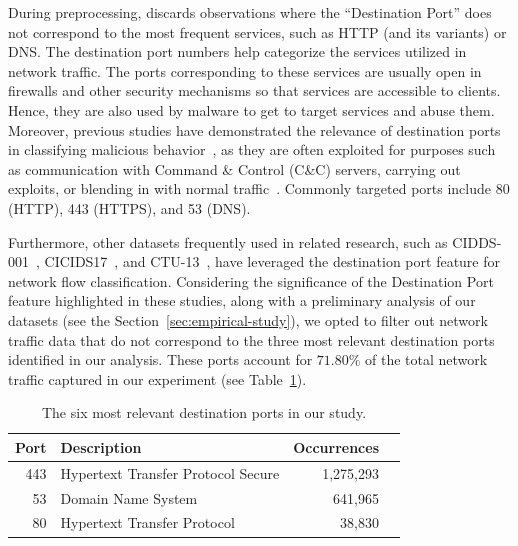 

During preprocessing, \droidxpflow discards observations where the ``Destination Port'' does not correspond to the most frequent services,
such as HTTP (and its variants) or DNS. The destination port numbers help categorize the services utilized in network traffic. The ports corresponding to these services are usually open in firewalls and other security mechanisms so that services are accessible to clients. Hence, they are also used by malware to get to target services and abuse them. Moreover, 
previous studies have demonstrated the relevance of destination ports in classifying malicious behavior~\cite{DBLP:journals/compsec/UmerSB17,DBLP:journals/comsur/SperottoSSMPS10},
as they are often exploited for purposes such as communication with Command \& Control (C\&C) servers, carrying out exploits,
or blending in with normal traffic~\cite{DBLP:journals/comsur/SperottoSSMPS10}. Commonly targeted ports include 80 (HTTP), 443 (HTTPS), and 53 (DNS).

Furthermore, other datasets frequently used in related research, such as CIDDS-001~\cite{Ring2017FlowbasedBD}, CICIDS17~\cite{DBLP:conf/icict/MahfouzVS19},
and CTU-13~\cite{DBLP:journals/compsec/GarciaGSZ14}, have leveraged the destination port feature for network flow classification.
Considering the significance of the Destination Port feature highlighted in these studies, along with a preliminary analysis of our datasets
(see the Section~\ref{sec:empirical-study}), we opted to filter out network traffic data that do not correspond to the three most
relevant destination ports identified in our analysis. These ports account for $71.80\%$ of the total network traffic captured in our experiment
(see Table~\ref{tab:port}).

\begin{table}[h]
\centering
\caption{The six most relevant destination ports in our study.}
\begin{small}
\begin{tabular}{rlrl} 
\hline
Port & Description & Occurrences \\ 
\hline
443 & Hypertext Transfer Protocol Secure & 1,275,293 \\ 
53 & Domain Name System & 641,965 \\ 
80 & Hypertext Transfer Protocol & 38,830 \\ 
\hline
\end{tabular}
\end{small}
\label{tab:port}
\end{table}

